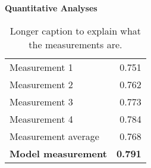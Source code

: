 \documentclass{article}
\begin{document}
\begin{adjustwidth}{-60pt}{-30pt}
\begin{singlespace}
\begin{tcolorbox}[title=\textbf{Model Card - CheXNet},
    breakable, sharp corners, boxrule=0.7pt]
{\textbf{Quantitative Analyses}

\begin{table}[H]
\centering
\small{
\begin{tabular}{lr}
Measurement 1       & 0.751  \\
Measurement 2       & 0.762 \\
Measurement 3       & 0.773 \\
Measurement 4       & 0.784 \\
Measurement average & 0.768  \\ \hline
\textbf{Model measurement}  & \textbf{0.791} \\ \hline
\end{tabular} } \\
\caption[Short caption used in list of tables.]{\small{Longer caption to explain what the measurements are.}}
\end{table}

} %
\end{tcolorbox}
\end{singlespace}
\end{adjustwidth}
\end{document}
